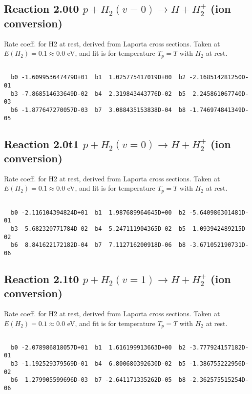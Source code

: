 \documentclass[12pt,dvipdfmx]{article}
\begin{document}
\newpage
\subsection{
Reaction 2.0t0
$ p + H_2(v=0) \rightarrow H + H_2^+$ (ion conversion)
}
Rate coeff. for H2 at rest, derived from Laporta cross sections.
Taken at $E(H_2) = 0.1 \approx 0.0$ eV,  and fit is for temperature $T_p=T$ with $H_2$ at rest.

\begin{small}\begin{verbatim}

  b0 -1.609953647479D+01  b1  1.025775417019D+00  b2 -2.168514281250D-01
  b3 -7.868514633649D-02  b4  2.319843443776D-02  b5  2.245861067740D-03
  b6 -1.877647270057D-03  b7  3.088435153838D-04  b8 -1.746974841349D-05

\end{verbatim}\end{small}

\newpage
\subsection{
Reaction 2.0t1
$ p + H_2(v=0) \rightarrow H + H_2^+$ (ion conversion)
}
Rate coeff. for H2 at rest, derived from Laporta cross sections.
Taken at $E(H_2) = 0.1 \approx 0.0$ eV,  and fit is for temperature $T_p=T$ with $H_2$ at rest.

\begin{small}\begin{verbatim}

  b0 -2.116104394824D+01  b1  1.987689964645D+00  b2 -5.640986301481D-01
  b3 -5.682320771784D-02  b4  5.247111904365D-02  b5 -1.093942489215D-02
  b6  8.841622172182D-04  b7  7.112716200918D-06  b8 -3.671052190731D-06

\end{verbatim}\end{small}

\newpage
\subsection{
Reaction 2.1t0
$ p + H_2(v=1) \rightarrow H + H_2^+$ (ion conversion)
}
Rate coeff. for H2 at rest, derived from Laporta cross sections.
Taken at $E(H_2) = 0.1 \approx 0.0$ eV,  and fit is for temperature $T_p=T$ with $H_2$ at rest.

\begin{small}\begin{verbatim}

  b0 -2.078986818057D+01  b1  1.616199913663D+00  b2 -3.777924157182D-01
  b3 -1.192529379569D-01  b4  6.800680392630D-02  b5 -1.386755222956D-02
  b6  1.279905599696D-03  b7 -2.641171335262D-05  b8 -2.362575515254D-06

\end{verbatim}\end{small}
\end{document}
